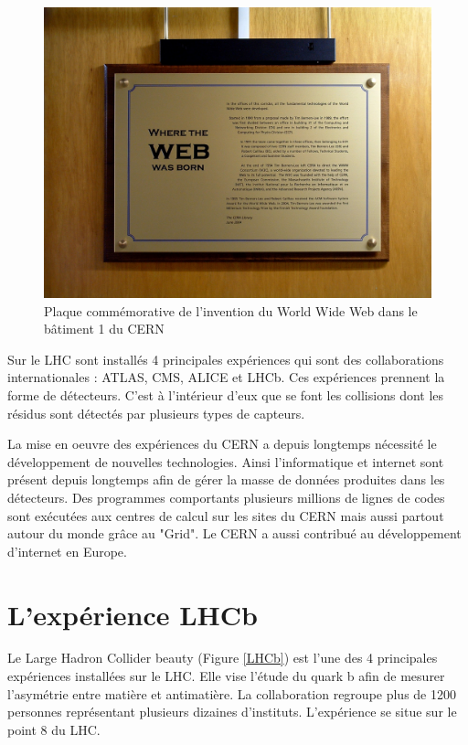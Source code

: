\documentclass[a4paper]{report}
\begin{document}
\begin{figure}[!htb]
    \includegraphics[width=\textwidth, center]{WEB.jpg}
    \caption{Plaque commémorative de l'invention du World Wide Web dans le bâtiment 1 du CERN}
    \label{WEB}
\end{figure}

Sur le LHC sont installés 4 principales expériences qui sont des collaborations internationales : ATLAS, CMS, ALICE et LHCb.
Ces expériences prennent la forme de détecteurs. C'est à l'intérieur d'eux que se font les collisions dont les résidus sont détectés par plusieurs types de capteurs.

La mise en oeuvre des expériences du CERN a depuis longtemps nécessité le développement de nouvelles technologies.
Ainsi l'informatique et internet sont présent depuis longtemps afin de gérer la masse de données produites dans les détecteurs.
Des programmes comportants plusieurs millions de lignes de codes sont exécutées aux centres de calcul sur les sites du CERN mais aussi partout autour du monde grâce au "Grid".
Le CERN a aussi contribué au développement d'internet en Europe.

\section{L'expérience LHCb}
Le Large Hadron Collider beauty (Figure \ref{LHCb}) est l'une des 4 principales expériences installées sur le LHC.
Elle vise l'étude du quark b afin de mesurer l'asymétrie entre matière et antimatière.
La collaboration regroupe plus de 1200 personnes représentant plusieurs dizaines d'instituts.
L'expérience se situe sur le point 8 du LHC.
\end{document}
